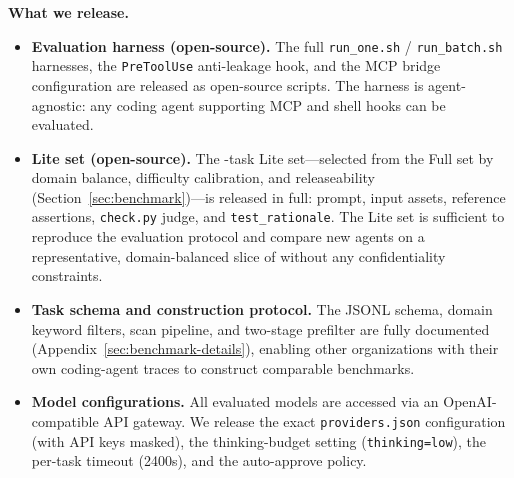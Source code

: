 \textbf{What we release.}
\begin{itemize}
    \item \textbf{Evaluation harness (open-source).} The full \texttt{run\_one.sh} / \texttt{run\_batch.sh} harnesses, the \texttt{PreToolUse} anti-leakage hook, and the MCP bridge configuration are released as open-source scripts. The harness is agent-agnostic: any coding agent supporting MCP and shell hooks can be evaluated.
    \item \textbf{Lite set (open-source).} The \LiteSet{}-task Lite set---selected from the Full set by domain balance, difficulty calibration, and releaseability (Section~\ref{sec:benchmark})---is released in full: prompt, input assets, reference assertions, \texttt{check.py} judge, and \texttt{test\_rationale}. The Lite set is sufficient to reproduce the evaluation protocol and compare new agents on a representative, domain-balanced slice of \bench{} without any confidentiality constraints.
    \item \textbf{Task schema and construction protocol.} The JSONL schema, domain keyword filters, scan pipeline, and two-stage prefilter are fully documented (Appendix~\ref{sec:benchmark-details}), enabling other organizations with their own coding-agent traces to construct comparable benchmarks.
    \item \textbf{Model configurations.} All evaluated models are accessed via an OpenAI-compatible API gateway. We release the exact \texttt{providers.json} configuration (with API keys masked), the thinking-budget setting (\texttt{thinking=low}), the per-task timeout (2400s), and the auto-approve policy.

\end{itemize}
